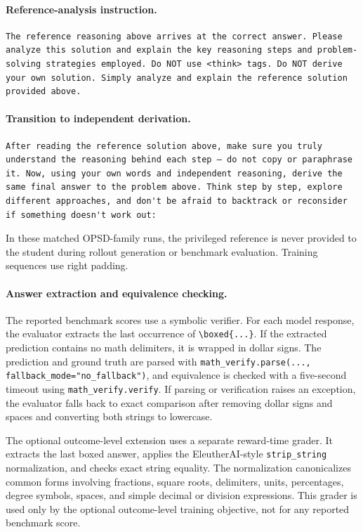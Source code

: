 \documentclass[letterpaper]{article} %
\begin{document}
\paragraph{Reference-analysis instruction.}
\begin{lstlisting}
The reference reasoning above arrives at the correct answer. Please analyze this solution and explain the key reasoning steps and problem-solving strategies employed. Do NOT use <think> tags. Do NOT derive your own solution. Simply analyze and explain the reference solution provided above.
\end{lstlisting}

\paragraph{Transition to independent derivation.}
\begin{lstlisting}
After reading the reference solution above, make sure you truly understand the reasoning behind each step — do not copy or paraphrase it. Now, using your own words and independent reasoning, derive the same final answer to the problem above. Think step by step, explore different approaches, and don't be afraid to backtrack or reconsider if something doesn't work out:
\end{lstlisting}

In these matched OPSD-family runs, the privileged reference is never
provided to the student during
rollout generation or benchmark evaluation. Training sequences use
right padding.

\paragraph{Answer extraction and equivalence checking.}
The reported benchmark scores use a symbolic verifier. For each model
response, the evaluator extracts the last occurrence of
\verb|\boxed{...}|. If the extracted prediction contains no math
delimiters, it is wrapped in dollar signs. The prediction and ground
truth are parsed with
\texttt{math\_verify.parse(..., fallback\_mode="no\_fallback")}, and
equivalence is checked with a five-second timeout using
\texttt{math\_verify.verify}. If parsing or verification raises an
exception, the evaluator falls back to exact comparison after removing
dollar signs and spaces and converting both strings to lowercase.

The optional outcome-level extension uses a separate reward-time
grader. It extracts the last boxed answer, applies the EleutherAI-style
\texttt{strip\_string} normalization, and checks exact string equality.
The normalization canonicalizes common forms involving fractions,
square roots, delimiters, units, percentages, degree symbols, spaces,
and simple decimal or division expressions. This grader is used only by
the optional outcome-level training objective, not for any reported
benchmark score.
\end{document}
